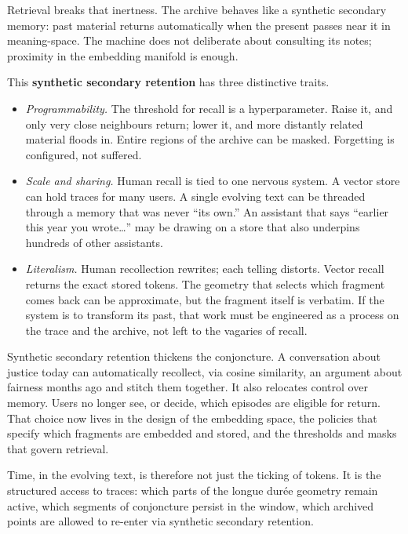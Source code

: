 \documentclass[12pt,a4paper]{article}
\begin{document}
Retrieval breaks that inertness. The archive behaves like a synthetic secondary memory: past material returns automatically when the present passes near it in meaning-space. The machine does not deliberate about consulting its notes; proximity in the embedding manifold is enough.

This \textbf{synthetic secondary retention} has three distinctive traits.

\begin{itemize}
  \item \emph{Programmability.} The threshold for recall is a hyperparameter. Raise it, and only very close neighbours return; lower it, and more distantly related material floods in. Entire regions of the archive can be masked. Forgetting is configured, not suffered.

  \item \emph{Scale and sharing.} Human recall is tied to one nervous system. A vector store can hold traces for many users. A single evolving text can be threaded through a memory that was never ``its own.'' An assistant that says ``earlier this year you wrote\ldots'' may be drawing on a store that also underpins hundreds of other assistants.

  \item \emph{Literalism.} Human recollection rewrites; each telling distorts. Vector recall returns the exact stored tokens. The geometry that selects which fragment comes back can be approximate, but the fragment itself is verbatim. If the system is to transform its past, that work must be engineered as a process on the trace and the archive, not left to the vagaries of recall.
\end{itemize}

Synthetic secondary retention thickens the conjoncture. A conversation about justice today can automatically recollect, via cosine similarity, an argument about fairness months ago and stitch them together. It also relocates control over memory. Users no longer see, or decide, which episodes are eligible for return. That choice now lives in the design of the embedding space, the policies that specify which fragments are embedded and stored, and the thresholds and masks that govern retrieval.

Time, in the evolving text, is therefore not just the ticking of tokens. It is the structured access to traces: which parts of the longue durée geometry remain active, which segments of conjoncture persist in the window, which archived points are allowed to re-enter via synthetic secondary retention.
\end{document}
